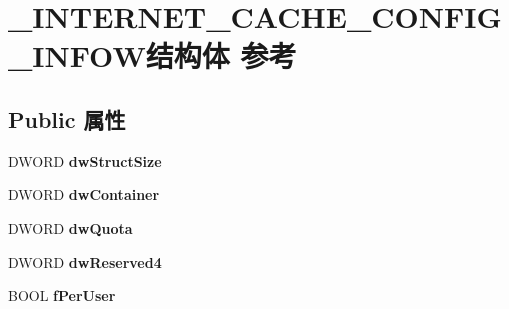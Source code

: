 \hypertarget{struct___i_n_t_e_r_n_e_t___c_a_c_h_e___c_o_n_f_i_g___i_n_f_o_w}{}\section{\+\_\+\+I\+N\+T\+E\+R\+N\+E\+T\+\_\+\+C\+A\+C\+H\+E\+\_\+\+C\+O\+N\+F\+I\+G\+\_\+\+I\+N\+F\+O\+W结构体 参考}
\label{struct___i_n_t_e_r_n_e_t___c_a_c_h_e___c_o_n_f_i_g___i_n_f_o_w}
\subsection*{Public 属性}
\begin{DoxyCompactItemize}
\item 
\mbox{\label{struct___i_n_t_e_r_n_e_t___c_a_c_h_e___c_o_n_f_i_g___i_n_f_o_w_a639be66a2def35713d8c48f78285b2f3}} 
D\+W\+O\+RD {\bfseries dw\+Struct\+Size}
\item 
\mbox{\label{struct___i_n_t_e_r_n_e_t___c_a_c_h_e___c_o_n_f_i_g___i_n_f_o_w_ada11fac511fd3f7d26b0de5797be3779}} 
D\+W\+O\+RD {\bfseries dw\+Container}
\item 
\mbox{\label{struct___i_n_t_e_r_n_e_t___c_a_c_h_e___c_o_n_f_i_g___i_n_f_o_w_a61450e8d6201b106cab6ed3f9c2fdae0}} 
D\+W\+O\+RD {\bfseries dw\+Quota}
\item 
\mbox{\label{struct___i_n_t_e_r_n_e_t___c_a_c_h_e___c_o_n_f_i_g___i_n_f_o_w_a641018b86f5d54d85a8269704f7d98cc}} 
D\+W\+O\+RD {\bfseries dw\+Reserved4}
\item 
\mbox{\label{struct___i_n_t_e_r_n_e_t___c_a_c_h_e___c_o_n_f_i_g___i_n_f_o_w_a218ffc1dd79373346f0f2a814723aee4}} 
B\+O\+OL {\bfseries f\+Per\+User}
\item 
\mbox{\label{struct___i_n_t_e_r_n_e_t___c_a_c_h_e___c_o_n_f_i_g___i_n_f_o_w_a59446a783aea0486135cbc0917d74fe4}} 

\end{DoxyCompactItemize}
